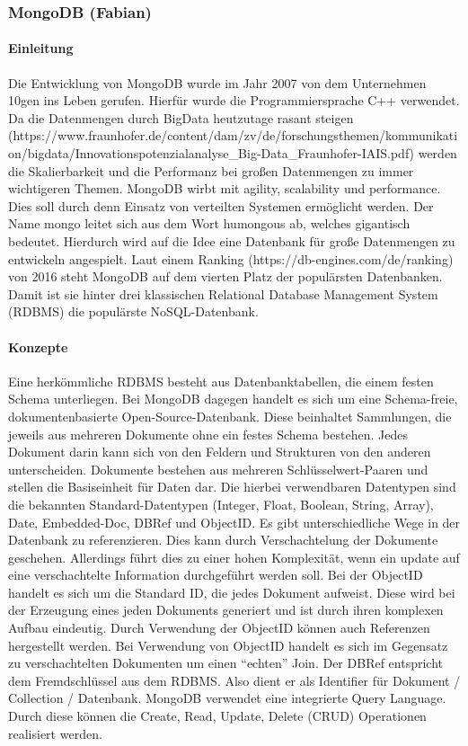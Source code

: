 \subsubsection{MongoDB (Fabian)}\label{mongodb-fabian}

\paragraph{Einleitung}\label{einleitung}

Die Entwicklung von MongoDB wurde im Jahr 2007 von dem Unternehmen 10gen
ins Leben gerufen. Hierfür wurde die Programmiersprache C++ verwendet.
Da die Datenmengen durch BigData heutzutage rasant steigen
(https://www.fraunhofer.de/content/dam/zv/de/forschungsthemen/kommunikation/bigdata/Innovationspotenzialanalyse\_Big-Data\_Fraunhofer-IAIS.pdf)
werden die Skalierbarkeit und die Performanz bei großen Datenmengen zu
immer wichtigeren Themen. MongoDB wirbt mit agility, scalability und
performance. Dies soll durch denn Einsatz von verteilten Systemen
ermöglicht werden. Der Name mongo leitet sich aus dem Wort humongous ab,
welches gigantisch bedeutet. Hierdurch wird auf die Idee eine Datenbank
für große Datenmengen zu entwickeln angespielt. Laut einem Ranking
(https://db-engines.com/de/ranking) von 2016 steht MongoDB auf dem
vierten Platz der populärsten Datenbanken. Damit ist sie hinter drei
klassischen Relational Database Management System (RDBMS) die populärste
NoSQL-Datenbank.

\paragraph{Konzepte}\label{konzepte}

Eine herkömmliche RDBMS besteht aus Datenbanktabellen, die einem festen
Schema unterliegen. Bei MongoDB dagegen handelt es sich um eine
Schema-freie, dokumentenbasierte Open-Source-Datenbank. Diese beinhaltet
Sammlungen, die jeweils aus mehreren Dokumente ohne ein festes Schema
bestehen. Jedes Dokument darin kann sich von den Feldern und Strukturen
von den anderen unterscheiden. Dokumente bestehen aus mehreren
Schlüsselwert-Paaren und stellen die Basiseinheit für Daten dar. Die
hierbei verwendbaren Datentypen sind die bekannten Standard-Datentypen
(Integer, Float, Boolean, String, Array), Date, Embedded-Doc, DBRef und
ObjectID. Es gibt unterschiedliche Wege in der Datenbank zu
referenzieren. Dies kann durch Verschachtelung der Dokumente geschehen.
Allerdings führt dies zu einer hohen Komplexität, wenn ein update auf
eine verschachtelte Information durchgeführt werden soll. Bei der
ObjectID handelt es sich um die Standard ID, die jedes Dokument
aufweist. Diese wird bei der Erzeugung eines jeden Dokuments generiert
und ist durch ihren komplexen Aufbau eindeutig. Durch Verwendung der
ObjectID können auch Referenzen hergestellt werden. Bei Verwendung von
ObjectID handelt es sich im Gegensatz zu verschachtelten Dokumenten um
einen ``echten'' Join. Der DBRef entspricht dem Fremdschlüssel aus dem
RDBMS. Also dient er als Identifier für Dokument / Collection /
Datenbank. MongoDB verwendet eine integrierte Query Language. Durch
diese können die Create, Read, Update, Delete (CRUD) Operationen
realisiert werden.


